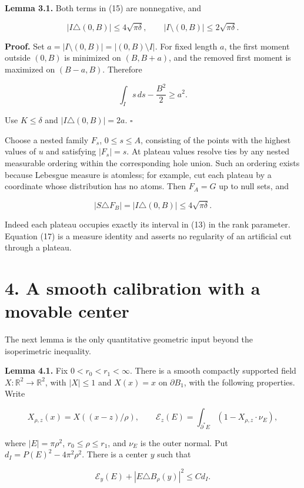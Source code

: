 \documentclass[11pt]{article}
\begin{document}
\textbf{Lemma 3.1.} Both terms in (15) are nonnegative, and

\[
|I\triangle(0,B)|\le4\sqrt{\pi\delta},\qquad
|I\setminus(0,B)|\le2\sqrt{\pi\delta}.
\tag{16}
\]

\textbf{Proof.} Set \(a=|I\setminus(0,B)|=|(0,B)\setminus I|\). For
fixed length \(a\), the first moment outside \((0,B)\) is minimized on
\((B,B+a)\), and the removed first moment is maximized on \((B-a,B)\).
Therefore

\[
\int_I s\,ds-\frac{B^2}{2}\ge a^2.
\]

Use \(K\le\delta\) and \(|I\triangle(0,B)|=2a\). \(\square\)

Choose a nested family \(F_s\), \(0\le s\le A\), consisting of the
points with the highest values of \(u\) and satisfying \(|F_s|=s\). At
plateau values resolve ties by any nested measurable ordering within the
corresponding hole union. Such an ordering exists because Lebesgue
measure is atomless; for example, cut each plateau by a coordinate whose
distribution has no atoms. Then \(F_A=G\) up to null sets, and

\[
|S\triangle F_B|=|I\triangle(0,B)|\le4\sqrt{\pi\delta}.
\tag{17}
\]

Indeed each plateau occupies exactly its interval in (13) in the rank
parameter. Equation (17) is a measure identity and asserts no regularity
of an artificial cut through a plateau.

\section{4. A smooth calibration with a movable
center}\label{a-smooth-calibration-with-a-movable-center}

The next lemma is the only quantitative geometric input beyond the
isoperimetric inequality.

\textbf{Lemma 4.1.} Fix \(0<r_0<r_1<\infty\). There is a smooth
compactly supported field \(X:\mathbb R^2\to\mathbb R^2\), with
\(|X|\le1\) and \(X(x)=x\) on \(\partial B_1\), with the following
properties. Write

\[
X_{\rho,z}(x)=X((x-z)/\rho),\qquad
\mathcal E_z(E)=\int_{\partial^*E}(1-X_{\rho,z}\cdot\nu_E),
\]

where \(|E|=\pi\rho^2\), \(r_0\le\rho\le r_1\), and \(\nu_E\) is the
outer normal. Put \(d_I=P(E)^2-4\pi^2\rho^2\). There is a center \(y\)
such that

\[
\mathcal E_y(E)+|E\triangle B_\rho(y)|^2\le C d_I.
\tag{18}
\]
\end{document}
